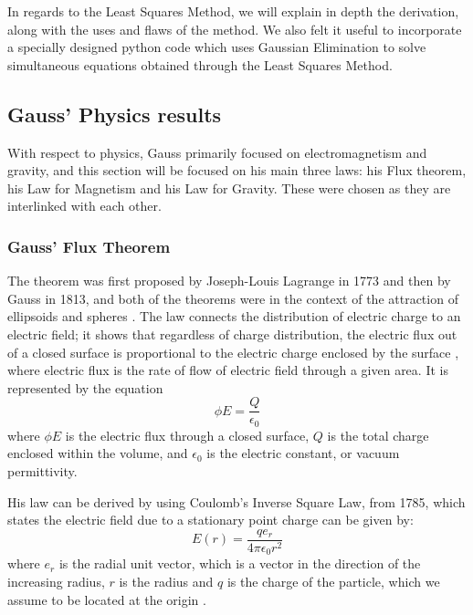 \documentclass{article}
\begin{document}
In regards to the Least Squares Method, we will explain in depth the derivation, along with the uses and flaws of the method. We also felt it useful to incorporate a specially designed python code which uses Gaussian Elimination to solve simultaneous equations obtained through the Least Squares Method. 

\subsection{Gauss' Physics results}
With respect to physics, Gauss primarily focused on electromagnetism and gravity, and this section will be focused on his main three laws: his Flux theorem, his Law for Magnetism and his Law for Gravity. These were chosen as they are interlinked with each other. 

\subsubsection{Gauss' Flux Theorem}
The theorem was first proposed by Joseph-Louis Lagrange in 1773 and then by Gauss in 1813, and both of the theorems were in the context of the attraction of ellipsoids and spheres \cite{flux}. The law connects the distribution of electric charge to an electric field; it shows that regardless of charge distribution, the electric flux out of a closed surface is proportional to the electric charge enclosed by the surface \cite{flux}, where electric flux is the rate of flow of electric field through a given area. It is represented by the equation \[\phi E = \frac{Q}{\epsilon_0}\] where \(\phi E\) is the electric flux through a closed surface, \(Q\) is the total charge enclosed within the volume, and \(\epsilon_0\) is the electric constant, or vacuum permittivity. 

His law can be derived by using Coulomb's Inverse Square Law, from 1785, which states the electric field due to a stationary point charge can be given by: \[E(r) = \frac{q e_r}{4\pi \epsilon_0 r^2}\] where \(e_r\) is the radial unit vector, which is a vector in the direction of the increasing radius, \(r\) is the radius and \(q\) is the charge of the particle, which we assume to be located at the origin \cite{flux}.
\end{document}
